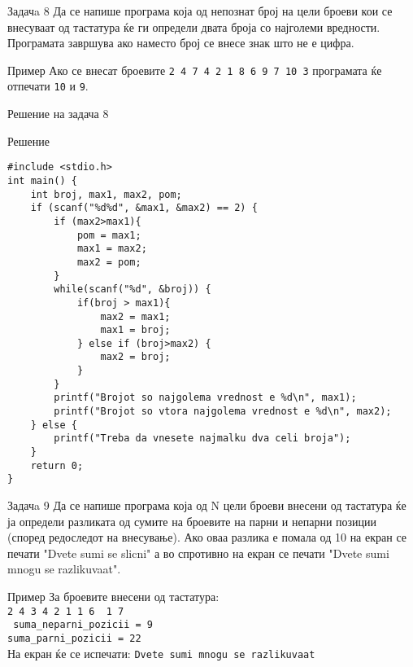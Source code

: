 \begin{frame}{Задачa 8}
Да се напише програма која од непознат број на цели броеви кои се внесуваат од тастатура 
ќе ги определи двата броја со најголеми вредности. Програмата завршува ако наместо 
број се внесе знак што не е цифра. 
\begin{exampleblock}{Пример}
Ако се внесат броевите \texttt{2 4 7 4 2 1 8 6 9 7 10 3} програмата ќе отпечати 
\texttt{10} и \texttt{9}.
\end{exampleblock}
\end{frame}

\begin{frame}[fragile]{Решение на задача 8}
\begin{exampleblock}{Решение}
\begin{lstlisting}
#include <stdio.h> 
int main() { 
    int broj, max1, max2, pom; 
    if (scanf("%d%d", &max1, &max2) == 2) { 
        if (max2>max1){ 
            pom = max1; 
            max1 = max2; 
            max2 = pom; 
        } 
        while(scanf("%d", &broj)) { 
            if(broj > max1){ 
                max2 = max1; 
                max1 = broj; 
            } else if (broj>max2) { 
                max2 = broj; 
            } 
        } 
        printf("Brojot so najgolema vrednost e %d\n", max1); 
        printf("Brojot so vtora najgolema vrednost e %d\n", max2); 
    } else { 
        printf("Treba da vnesete najmalku dva celi broja"); 
    } 
    return 0; 
}
\end{lstlisting}
\end{exampleblock}
\end{frame}

\begin{frame}{Задачa 9}
Да се напише програма која од N цели броеви внесени од тастатура ќе ја определи 
разликата од сумите на броевите на парни и непарни позиции 
(според редоследот на внесување). Ако оваа разлика е помала од 10 на екран се печати 
"Dvete sumi se slicni" а во спротивно на екран се печати "Dvete sumi mnogu se
razlikuvaat".
\begin{exampleblock}{Пример}
За броевите внесени од тастатура:\\
\texttt{{\color{red}2} 4 {\color{red}3} 4 {\color{red}2} 1 {\color{red}1} 6
{\color{red} 1} 7}\\
\texttt{{\color{red} suma\_neparni\_pozicii = 9}}\\
\texttt{suma\_parni\_pozicii = 22}\\
На екран ќе се испечати: \texttt{Dvete sumi mnogu se razlikuvaat}
\end{exampleblock}
\end{frame}

